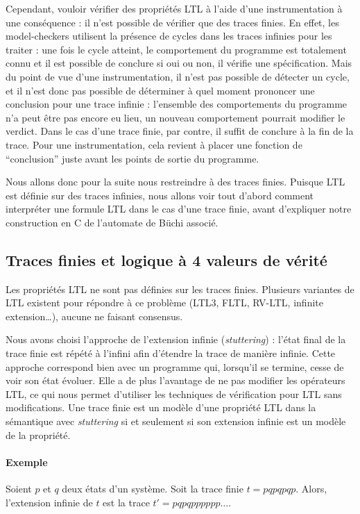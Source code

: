 Cependant, vouloir vérifier des propriétés \ac{LTL} à l'aide d'une
instrumentation à une conséquence : il n'est possible de vérifier que des traces
finies. En effet, les model-checkers utilisent la présence de cycles dans les
traces infinies pour les traiter : une fois le cycle atteint, le comportement du
programme est totalement connu et il est possible de conclure si oui ou non, il
vérifie une spécification. Mais du point de vue d'une instrumentation, il n'est
pas possible de détecter un cycle, et il n'est donc pas possible de déterminer à
quel moment prononcer une conclusion pour une trace infinie : l'ensemble des
comportements du programme n'a peut être pas encore eu lieu, un nouveau
comportement pourrait modifier le verdict. Dans le cas d'une trace finie, par
contre, il suffit de conclure à la fin de la trace. Pour une instrumentation,
cela revient à placer une fonction de ``conclusion'' juste avant les points de
sortie du programme.

Nous allons donc pour la suite nous restreindre à des traces finies. Puisque
\ac{LTL} est définie sur des traces infinies, nous allons voir tout d'abord
comment interpréter une formule \ac{LTL} dans le cas d'une trace finie, avant
d'expliquer notre construction en C de l'automate de Büchi associé.

\subsection{Traces finies et logique à 4 valeurs de vérité}

Les propriétés \ac{LTL} ne sont pas définies sur les traces finies. Plusieurs
variantes de \ac{LTL} existent pour répondre à ce problème (LTL3, FLTL, RV-LTL,
infinite extension\ldots{}), aucune ne faisant consensus.

Nous avons choisi l'approche de l'extension infinie (\emph{stuttering}) : l'état final de la
trace finie est répété à l'infini afin d'étendre la trace de manière
infinie. Cette approche correspond bien avec un programme qui, lorsqu'il
se termine, cesse de voir son état évoluer. Elle a de plus
l'avantage de ne pas modifier les opérateurs \ac{LTL}, ce qui nous permet
d'utiliser les techniques de vérification pour \ac{LTL} sans modifications.
Une trace finie est un modèle d'une propriété \ac{LTL} dans la sémantique
avec \emph{stuttering} si et seulement si son extension infinie est un
modèle de la propriété.

\paragraph{Exemple}
Soient \(p\) et \(q\) deux états d'un système. Soit la trace finie \(t =
pqpqpqp\). Alors, l'extension infinie de \(t\) est la trace \(t' =
pqpqpppppp\dots\).


